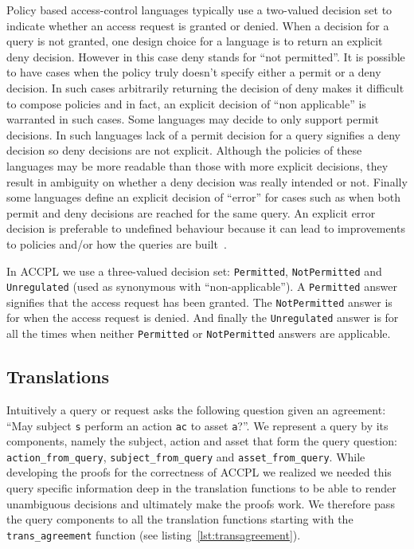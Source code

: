 \documentclass[runningheads,a4paper]{llncs}
\newcommand{\syn}{\texttt}
\begin{document}
Policy based access-control languages typically use a two-valued decision set to indicate whether an access request is granted or denied. When a decision for a query is not granted, one design choice for a language is to return an explicit deny decision. However in this case deny stands for ``not permitted''. It is possible to have cases when the policy truly doesn't specify either a permit or a deny decision. In such cases arbitrarily returning the decision of deny makes it difficult to compose policies and in fact, an explicit decision of ``non applicable'' is warranted in such cases. Some languages may decide to only support permit decisions. In such languages lack of a permit decision for a query signifies a deny decision so deny decisions are not explicit. Although the policies of these languages may be more readable than those with more explicit decisions, they result in ambiguity on whether a deny decision was really intended or not. Finally some languages define an explicit decision of ``error'' for cases such as when both permit and deny decisions are reached for the same query. An explicit error decision is preferable to undefined behaviour because it can lead to improvements to policies and/or how the queries are built~\cite{Tschantz}. 

In \ac{ACCPL} we use a three-valued decision set: \syn{Permitted}, \syn{NotPermitted} and \syn{Unregulated} (used as synonymous with ``non-applicable''). A \syn{Permitted} answer signifies that the access request has been granted. The \syn{NotPermitted} answer is for when the access request is denied. And finally the \syn{Unregulated} answer is for all the times when neither \syn{Permitted} or \syn{NotPermitted} answers are applicable.

\subsection{Translations}\label{sec:translationfuncs}

Intuitively a query or request asks the following question given an agreement: ``May subject \syn{s} perform an action \syn{ac} to asset \syn{a}?''. We represent a query by its components, namely the subject, action and asset that form the query question: \syn{action_from_query}, \syn{subject_from_query} and \syn{asset_from_query}. While developing the proofs for the correctness of \ac{ACCPL} we realized we needed this query specific information deep in the translation functions to be able to render unambiguous decisions and ultimately make the proofs work. We therefore pass the query components to all the translation functions starting with the \syn{trans_agreement} function (see listing~\ref{lst:transagreement}). 
\end{document}
